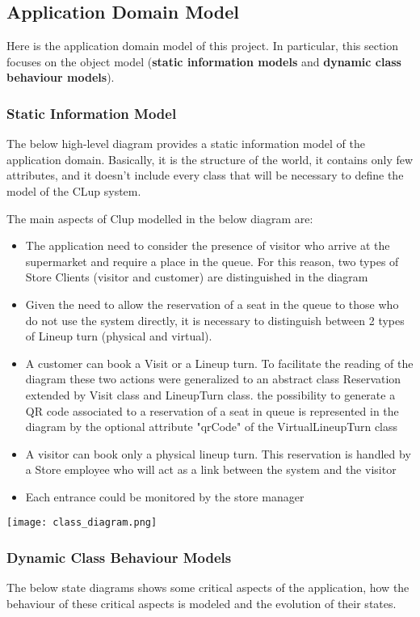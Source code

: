 \subsection{Application Domain Model}
Here is the application domain model of this project. In particular, this section focuses on the object model (\textbf{static information models} and \textbf{dynamic class behaviour models}).
\subsubsection{Static Information Model}
The below high-level diagram provides a static information model of the application domain. Basically, it is the structure of the world, it contains only few attributes, and it doesn't include every class that will be necessary to define the model of the CLup system.

The main aspects of Clup modelled in the below diagram are:
\begin{itemize}
    \item The application need to consider the presence of visitor who arrive at the supermarket and require a place in the queue. For this reason, two types of Store Clients (visitor and customer) are distinguished in the diagram
    \item Given the need to allow the reservation of a seat in the queue to those who do not use the system directly, it is necessary to distinguish between 2 types of Lineup turn (physical and virtual).
    \item A customer can book a Visit or a Lineup turn. To facilitate the reading of the diagram these two actions were generalized to an abstract class Reservation extended by Visit class and LineupTurn class. the possibility to generate a QR code associated to a reservation of a seat in queue is represented in the diagram by the optional attribute "qrCode" of the VirtualLineupTurn class
    \item A visitor can book only a physical lineup turn. This reservation is handled by a Store employee who will act as a link between the system and the visitor
    \item Each entrance could be monitored by the store manager
\end{itemize}
\texttt{[image: class\_diagram.png]}


\subsubsection{Dynamic Class Behaviour Models}
The below state diagrams shows some	critical aspects of	the	application, how the behaviour of these critical aspects is modeled and the evolution of their states.

